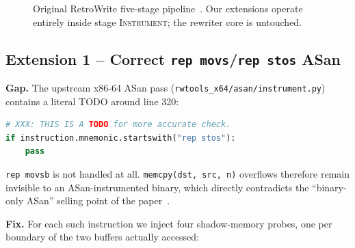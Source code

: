 \documentclass[10pt,a4paper]{article}
\begin{document}
\begin{figure}[H]
\centering
{}
\caption{Original RetroWrite five-stage pipeline~\cite{retrowrite}. Our
extensions operate entirely inside stage \textsc{Instrument}; the rewriter
core is untouched.}
\label{fig:pipeline}
\end{figure}

\subsection{Extension 1 -- Correct \texttt{rep movs}/\texttt{rep stos} ASan}

\textbf{Gap.} The upstream x86-64 ASan pass
(\texttt{rwtools\_x64/asan/instrument.py}) contains a literal TODO
around line 320:
\begin{lstlisting}[language=Python]
# XXX: THIS IS A TODO for more accurate check.
if instruction.mnemonic.startswith("rep stos"):
    pass
\end{lstlisting}
\texttt{rep movsb} is not handled at all. \texttt{memcpy(dst, src, n)}
overflows therefore remain invisible to an ASan-instrumented binary, which
directly contradicts the ``binary-only ASan'' selling point of the
paper~\cite{retrowrite}.

\textbf{Fix.} For each such instruction we inject four shadow-memory probes,
one per boundary of the two buffers actually accessed:
\end{document}
